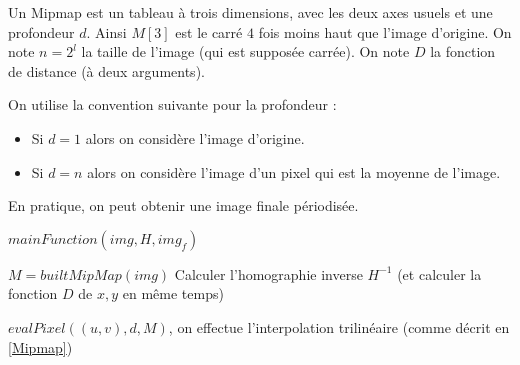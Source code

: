\label{pseudo_code_Mipmap}

Un Mipmap est un tableau à trois dimensions, avec les deux axes usuels et une profondeur $d$.
Ainsi $M[3]$ est le carré $4$ fois moins haut que l'image d'origine. On note $n=2^l$ la taille de l'image (qui est supposée carrée). On note $D$ la fonction de distance (à deux arguments).

On utilise la convention suivante pour la profondeur : 
\begin{itemize}
\item Si $d = 1$ alors on considère l'image d'origine.
\item Si $d = n$ alors on considère l'image d'un pixel qui est la moyenne de l'image.
\end{itemize}

En pratique, on peut obtenir une image finale périodisée. 


\medbreak
\medbreak
\begin{algorithm}[H]
\caption{$mainFunction(img,H,img_f)$}
\label{Mipmap1}
$M=builtMipMap(img)$ 
Calculer l'homographie inverse $H^{-1}$ (et calculer la fonction $D$ de $x,y$ en même temps)
\end{algorithm}

\medbreak
\medbreak
\medbreak
\medbreak

\begin{algorithm}[H]
\caption{$evalPixel((u,v),d,M)$, on effectue l'interpolation trilinéaire (comme décrit en \ref{Mipmap})}
\label{intertri1}

\end{algorithm}

